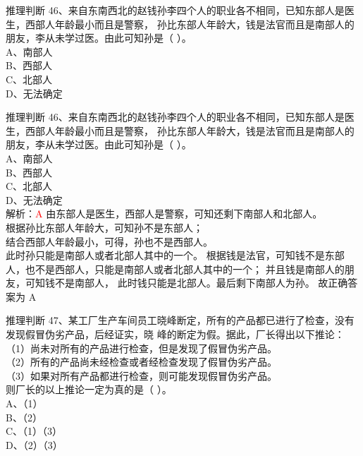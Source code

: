 \documentclass[aspectratio=169]{beamer}
\begin{document}
\begin{frame}[t]{推理判断}
    46、来自东南西北的赵钱孙李四个人的职业各不相同，已知东部人是医生，西部人年龄最小而且是警察，
    孙比东部人年龄大，钱是法官而且是南部人的朋友，李从未学过医。由此可知孙是（ ）。\\
    A、南部人    \\
    B、西部人    \\
    C、北部人    \\
    D、无法确定  \\
\end{frame}


\begin{frame}[t]{推理判断}
    46、来自东南西北的赵钱孙李四个人的职业各不相同，已知东部人是医生，西部人年龄最小而且是警察，
    孙比东部人年龄大，钱是法官而且是南部人的朋友，李从未学过医。由此可知孙是（ ）。\\
    A、南部人    \\
    B、西部人    \\
    C、北部人    \\
    D、无法确定  \\
    解析：\textcolor{red}{A}
    由东部人是医生，西部人是警察，可知还剩下南部人和北部人。\\
    根据孙比东部人年龄大，可知孙不是东部人；\\
    结合西部人年龄最小，可得，孙也不是西部人。\\
    此时孙只能是南部人或者北部人其中的一个。
    根据钱是法官，可知钱不是东部人，也不是西部人，只能是南部人或者北部人其中的一个；
    并且钱是南部人的朋友，可知钱不是南部人，
    此时钱只能是北部人。最后剩下南部人为孙。
    故正确答案为 A
\end{frame}

\begin{frame}[t]{推理判断}
    47、某工厂生产车间员工晓峰断定，所有的产品都已进行了检查，没有发现假冒伪劣产品，后经证实，晓
    峰的断定为假。据此，厂长得出以下推论：\\
    （1）尚未对所有的产品进行检查，但是发现了假冒伪劣产品。  \\
    （2）所有的产品尚未经检查或者经检查发现了假冒伪劣产品。  \\
    （3）如果对所有产品都进行检查，则可能发现假冒伪劣产品。  \\
    则厂长的以上推论一定为真的是（ ）。                      \\
    A、（1）                                                 \\
    B、（2）                                                  \\
    C、（1）（3）                                              \\
    D、（2）（3）\\
\end{frame}
\end{document}
